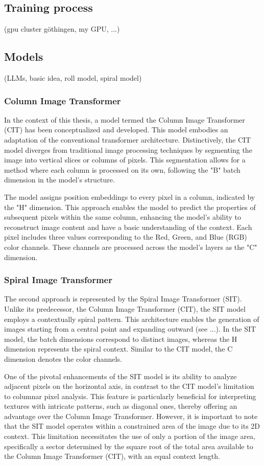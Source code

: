\subsection{Training process}
    (gpu cluster göthingen, my GPU, ...)

\subsection{Models}
    (LLMs, basic idea, roll model, spiral model)

    \subsubsection{Column Image Transformer}

    In the context of this thesis, a model termed the Column Image Transformer (CIT) has been conceptualized and developed. This model embodies an adaptation of the conventional transformer architecture. Distinctively, the CIT model diverges from traditional image processing techniques by segmenting the image into vertical slices or columns of pixels. This segmentation allows for a method where each column is processed on its own, following the "B" batch dimension in the model's structure.

    The model assigns position embeddings to every pixel in a column, indicated by the "H" dimension. This approach enables the model to predict the properties of subsequent pixels within the same column, enhancing the model's ability to reconstruct image content and have a basic understanding of the context. Each pixel includes three values corresponding to the Red, Green, and Blue (RGB) color channels. These channels are processed across the model's layers as the "C" dimension.

    \subsubsection{Spiral Image Transformer}

    The second approach is represented by the Spiral Image Transformer (SIT). Unlike its predecessor, the Column Image Transformer (CIT), the SIT model employs a contextually spiral pattern. This architecture enables the generation of images starting from a central point and expanding outward (see ...). In the SIT model, the batch dimensions correspond to distinct images, whereas the H dimension represents the spiral context. Similar to the CIT model, the C dimension denotes the color channels.

    One of the pivotal enhancements of the SIT model is its ability to analyze adjacent pixels on the horizontal axis, in contrast to the CIT model's limitation to columnar pixel analysis. This feature is particularly beneficial for interpreting textures with intricate patterns, such as diagonal ones, thereby offering an advantage over the Column Image Transformer. However, it is important to note that the SIT model operates within a constrained area of the image due to its 2D context. This limitation necessitates the use of only a portion of the image area, specifically a sector determined by the square root of the total area available to the Column Image Transformer (CIT), with an equal context length.
    
